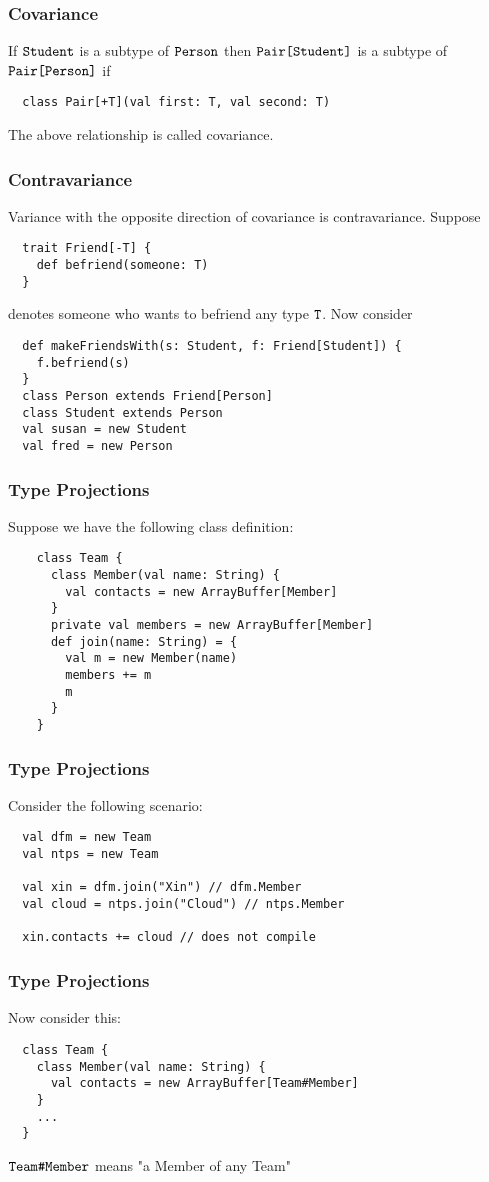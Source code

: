 \documentclass[handout]{beamer}
\begin{document}
\begin{frame}[fragile]
  \frametitle{Covariance}
  If $\verb|Student|$ is a subtype of $\verb|Person|$ then $\verb|Pair[Student]|$ is a subtype of
  $\verb|Pair[Person]|$ if
  \begin{verbatim}
  class Pair[+T](val first: T, val second: T)
  \end{verbatim}
  The above relationship is called covariance.
\end{frame}

\begin{frame}[fragile]
  \frametitle{Contravariance}
  Variance with the opposite direction of covariance is contravariance. Suppose
  \begin{verbatim}
  trait Friend[-T] {
    def befriend(someone: T) 
  }
  \end{verbatim}
  denotes someone who wants to befriend any type $\verb|T|$. Now consider
  \begin{verbatim}
  def makeFriendsWith(s: Student, f: Friend[Student]) {
    f.befriend(s)
  }
  class Person extends Friend[Person]
  class Student extends Person
  val susan = new Student
  val fred = new Person
  \end{verbatim}
\end{frame}

\begin{frame}[fragile]
  \frametitle{Type Projections}
  Suppose we have the following class definition:
  \begin{verbatim}
    class Team {
      class Member(val name: String) {
        val contacts = new ArrayBuffer[Member]
      }
      private val members = new ArrayBuffer[Member]
      def join(name: String) = {
        val m = new Member(name)
        members += m
        m
      }
    }
    \end{verbatim}
\end{frame}

\begin{frame}[fragile]
  \frametitle{Type Projections}
  Consider the following scenario:
  \begin{verbatim}
  val dfm = new Team
  val ntps = new Team

  val xin = dfm.join("Xin") // dfm.Member
  val cloud = ntps.join("Cloud") // ntps.Member

  xin.contacts += cloud // does not compile
  \end{verbatim}
\end{frame}

\begin{frame}[fragile]
  \frametitle{Type Projections}
  Now consider this:
  \begin{verbatim}
  class Team {
    class Member(val name: String) {
      val contacts = new ArrayBuffer[Team#Member]
    }
    ...
  }
  \end{verbatim}
  $\verb|Team#Member|$ means "a Member of any Team"
\end{frame}
\end{document}
